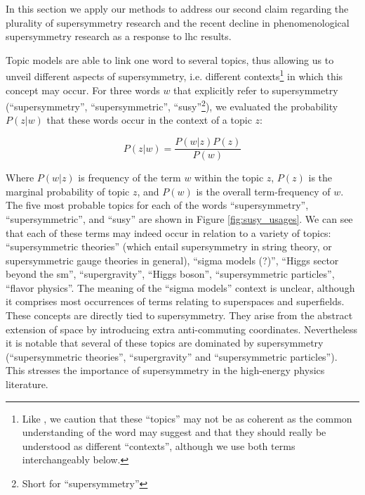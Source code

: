 \documentclass[smallextended]{svjour3}
\begin{document}
In this section we apply our methods to address our second claim regarding the plurality of supersymmetry research and the recent decline in phenomenological supersymmetry research as a response to  \gls{lhc} results.

Topic models are able to link one word to several topics, thus allowing us to unveil different aspects of supersymmetry, i.e. different contexts\footnote{Like \citet{Allen2022}, we caution that these ``topics'' may not be as coherent as the common understanding of the word may suggest and that they should really be understood as different ``contexts'', although we use both terms interchangeably below.} in which this concept may occur. For three words $w$ that explicitly refer to supersymmetry (``supersymmetry'', ``supersymmetric'', ``susy''\footnote{Short for ``supersymmetry''}), we evaluated the probability $P(z|w)$ that these words occur in the context of a topic $z$:

\begin{equation}
    P(z|w) = \dfrac{P(w|z)P(z)}{P(w)}
\end{equation}

Where $P(w|z)$ is frequency of the term $w$ within the topic $z$, $P(z)$ is the marginal probability of topic $z$, and $P(w)$ is the overall term-frequency of $w$. The five most probable topics for each of the words ``supersymmetry'', ``supersymmetric'', and ``susy''  are shown in Figure \ref{fig:susy_usages}. We can see that each of these terms may indeed occur in relation to a variety of topics: ``supersymmetric theories'' (which entail supersymmetry in string theory, or supersymmetric gauge theories in general), ``sigma models (?)'', ``Higgs sector beyond the \gls{sm}'', ``supergravity'', ``Higgs boson'', ``supersymmetric particles'', ``flavor physics''. The meaning of the ``sigma models'' context is unclear, although it comprises most occurrences of terms relating to superspaces and superfields. These concepts are directly tied to supersymmetry. They arise from the abstract extension of space by introducing extra anti-commuting coordinates. Nevertheless it is notable that several of these topics are dominated by supersymmetry (``supersymmetric theories'', ``supergravity'' and ``supersymmetric particles''). This stresses the importance of supersymmetry in the high-energy physics literature.
\end{document}
